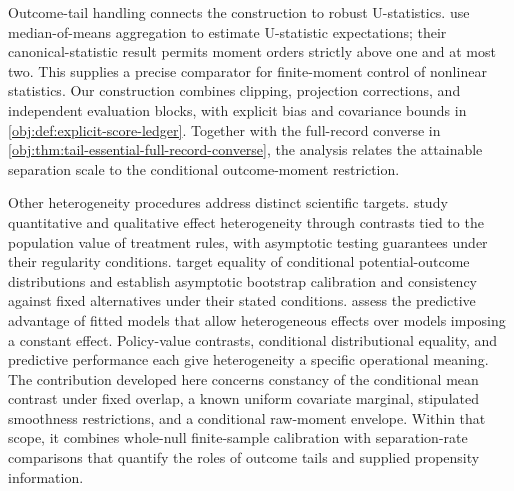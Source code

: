 Outcome-tail handling connects the construction to robust U-statistics. \citet[Section 2 and Theorem 3]{JolyLugosi2016RobustU} use median-of-means aggregation to estimate U-statistic expectations; their canonical-statistic result permits moment orders strictly above one and at most two. This supplies a precise comparator for finite-moment control of nonlinear statistics. Our construction combines clipping, projection corrections, and independent evaluation blocks, with explicit bias and covariance bounds in \cref{obj:def:explicit-score-ledger}. Together with the full-record converse in \cref{obj:thm:tail-essential-full-record-converse}, the analysis relates the attainable separation scale to the conditional outcome-moment restriction.

Other heterogeneity procedures address distinct scientific targets. \citet[Sections 2--4]{DukesStensrudBrioschiHudson2026Homogeneity} study quantitative and qualitative effect heterogeneity through contrasts tied to the population value of treatment rules, with asymptotic testing guarantees under their regularity conditions. \citet[Sections 2--3 and Theorem 3.3]{JainLuedtke2026Distributional} target equality of conditional potential-outcome distributions and establish asymptotic bootstrap calibration and consistency against fixed alternatives under their stated conditions. \citet[Sections 2--3]{AshouriHenderson2026Predictive} assess the predictive advantage of fitted models that allow heterogeneous effects over models imposing a constant effect. Policy-value contrasts, conditional distributional equality, and predictive performance each give heterogeneity a specific operational meaning. The contribution developed here concerns constancy of the conditional mean contrast under fixed overlap, a known uniform covariate marginal, stipulated smoothness restrictions, and a conditional raw-moment envelope. Within that scope, it combines whole-null finite-sample calibration with separation-rate comparisons that quantify the roles of outcome tails and supplied propensity information.
